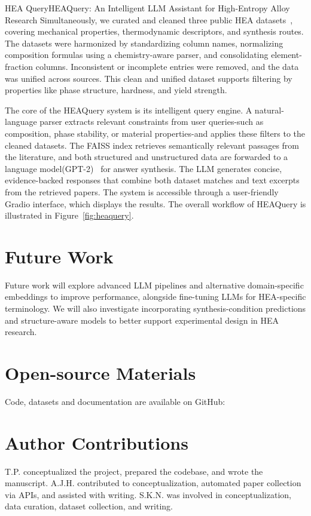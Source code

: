 \begin{teamsubmission}{HEA Query}{HEAQuery: An Intelligent LLM Assistant for High-Entropy Alloy Research}
Simultaneously, we curated and cleaned three public HEA datasets~\cite{BORG2020430,MACHAKA2021107346,precker20216403257}, covering mechanical properties, thermodynamic descriptors, and synthesis routes. The datasets were harmonized by standardizing column names, normalizing composition formulas using a chemistry-aware parser, and consolidating element-fraction columns. Inconsistent or incomplete entries were removed, and the data was unified across sources. This clean and unified dataset supports filtering by properties like phase structure, hardness, and yield strength.

The core of the HEAQuery system is its intelligent query engine. A natural-language parser extracts relevant constraints from user queries-such as composition, phase stability, or material properties-and applies these filters to the cleaned datasets. The FAISS index retrieves semantically relevant passages from the literature, and both structured and unstructured data are forwarded to a language model(GPT-2)~\cite{radford2019language} for answer synthesis. The LLM generates concise, evidence-backed responses that combine both dataset matches and text excerpts from the retrieved papers. The system is accessible through a user-friendly Gradio interface, which displays the results. The overall workflow of HEAQuery is illustrated in Figure~\ref{fig:heaquery}.



\section*{Future Work}

Future work will explore advanced LLM pipelines and alternative domain-specific embeddings to improve performance, alongside fine-tuning LLMs for HEA-specific terminology. We will also investigate incorporating synthesis-condition predictions and structure-aware models to better support experimental design in HEA research.


\section*{Open-source Materials}
Code, datasets and documentation are available on GitHub: 


\section*{Author Contributions}

T.P. conceptualized the project, prepared the codebase, and wrote the manuscript. A.J.H. contributed to conceptualization, automated paper collection via APIs, and assisted with writing. S.K.N. was involved in conceptualization, data curation, dataset collection, and writing.

\end{teamsubmission}



